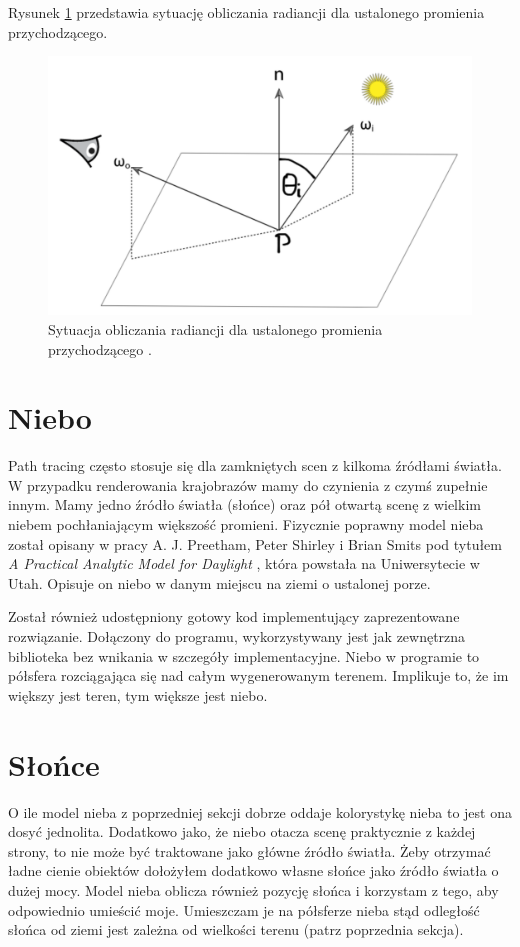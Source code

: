 \documentclass[inz,longabstract]{iithesis}
\begin{document}
        Rysunek \ref{fig:renderingEquation} przedstawia sytuację obliczania radiancji dla ustalonego promienia przychodzącego.
        
        \begin{figure}[H]
            \includegraphics[width=\linewidth]{renderingEquation.png}
            \caption{Sytuacja obliczania radiancji dla ustalonego promienia przychodzącego \cite{pbrt}.} 
            \label{fig:renderingEquation}
        \end{figure}
        
    \section{Niebo}
        Path tracing często stosuje się dla zamkniętych scen z kilkoma źródłami światła. W przypadku renderowania krajobrazów mamy do czynienia z czymś zupełnie innym. Mamy jedno źródło światła (słońce) oraz pół otwartą scenę z wielkim niebem pochłaniającym większość promieni. Fizycznie poprawny model nieba został opisany w pracy  A. J. Preetham, 
        Peter Shirley i Brian Smits pod tytułem \textit{A Practical Analytic Model for Daylight} \cite{sky}, która powstała na Uniwersytecie w Utah. Opisuje on niebo w danym miejscu na ziemi o ustalonej porze. 
        
        Został również udostępniony gotowy kod implementujący zaprezentowane rozwiązanie. Dołączony do programu, wykorzystywany jest jak zewnętrzna biblioteka bez wnikania w szczegóły implementacyjne. Niebo w programie to półsfera rozciągająca się nad całym wygenerowanym terenem. Implikuje to, że im większy jest teren, tym większe jest niebo.
    
    \section{Słońce}
        O ile model nieba z poprzedniej sekcji dobrze oddaje kolorystykę nieba to jest ona dosyć jednolita. Dodatkowo jako, że niebo otacza scenę praktycznie z każdej strony, to nie może być traktowane jako główne źródło światła. Żeby otrzymać ładne cienie obiektów dołożyłem dodatkowo własne słońce jako źródło światła o dużej mocy. Model nieba oblicza również pozycję słońca i korzystam z tego, aby odpowiednio umieścić moje. Umieszczam je na półsferze nieba stąd odległość słońca od ziemi jest zależna od wielkości terenu (patrz poprzednia sekcja).
        
\end{document}
